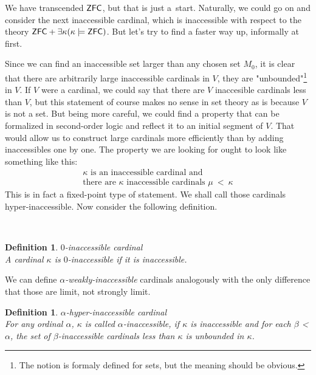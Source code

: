 \documentclass[12pt,a4paper]{article}
\newtheorem{definition}[theorem]{Definition}
\begin{document}


We have transcended $\sf{ZFC}$, but that is just a~start. Naturally, we could go on and consider the next inaccessible cardinal, which is inaccessible with respect to the theory $\sf{ZFC} + \exists \kappa (\kappa \models \sf{ZFC})$. But let's try to find a faster way up, informally at first. 

Since we can find an inaccessible set larger than any chosen set $M_0$, it is clear that there are arbitrarily large inaccessible cardinals in $V$, they are "unbounded"\footnote{The notion is formaly defined for sets, but the meaning should be obvious.} in $V$. If $V$ were a cardinal, we could say that there are $V$ inaccesible cardinals less than $V$, but this statement of course makes no sense in set theory as is because $V$ is not a set. But being more careful, we could find a property that can be formalized in second-order logic and reflect it to an initial segment of $V$. That would allow us to construct large cardinals more efficiently than by adding inaccessibles one by one. The property we are looking for ought to look like something like this:
\begin{equation}
\begin{gathered}
\kappa \mbox{ is an inaccessible cardinal and}\\
\mbox{there are }\kappa\mbox{ inaccessible cardinals }\mu\ <\ \kappa
\end{gathered}
\end{equation}
This is in fact a fixed-point type of statement. We shall call those cardinals hyper-inaccessible. Now consider the following definition.

\

\begin{definition}{$0$-inaccessible cardinal}\\
A cardinal $\kappa$ is $0$-inaccessible if it is inaccessible.
\end{definition}
We can define \emph{$\alpha$-weakly-inaccessible} cardinals analogously with the only difference that those are limit, not strongly limit.
\

\begin{definition}{$\alpha$-hyper-inaccessible cardinal}\label{def:alpha_inaccessible}\\
For any ordinal $\alpha$, $\kappa$ is called $\alpha$-inaccessible, if $\kappa$ is inaccessible and for each $\beta$ < $\alpha$, the set of $\beta$-inaccessible cardinals less than $\kappa$ is unbounded in $\kappa$.
\end{definition}
\end{document}
